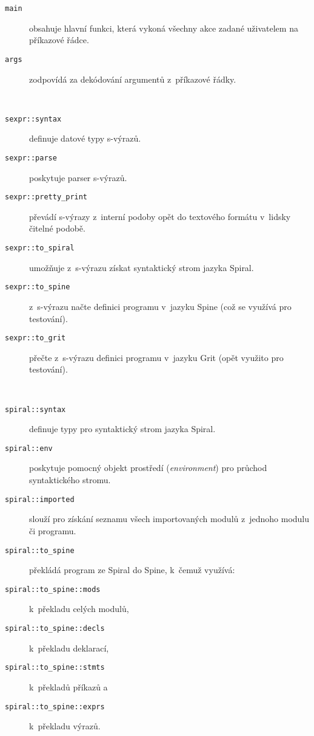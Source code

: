 \begin{description}
  \item[\texttt{main}] obsahuje hlavní funkci, která vykoná všechny akce zadané
    uživatelem na příkazové řádce.
  \item[\texttt{args}] zodpovídá za dekódování argumentů z~příkazové řádky.
\end{description}
~
\begin{description}
  \item[\texttt{sexpr::syntax}] definuje datové typy s-výrazů.
  \item[\texttt{sexpr::parse}] poskytuje parser s-výrazů.
  \item[\texttt{sexpr::pretty_print}] převádí s-výrazy z~interní podoby opět do
    textového formátu v~lidsky čitelné podobě.
  \item[\texttt{sexpr::to_spiral}] umožňuje z~s-výrazu získat syntaktický strom
    jazyka Spiral.
  \item[\texttt{sexpr::to_spine}] z~s-výrazu načte definici programu v~jazyku
    Spine (což se využívá pro testování).
  \item[\texttt{sexpr::to_grit}] přečte z~s-výrazu definici programu v~jazyku
    Grit (opět využito pro testování).
\end{description}
~
\begin{description}
  \item[\texttt{spiral::syntax}] definuje typy pro syntaktický strom jazyka
    Spiral.
  \item[\texttt{spiral::env}] poskytuje pomocný objekt prostředí
    (\emph{environment}) pro průchod syntaktického stromu.
  \item[\texttt{spiral::imported}] slouží pro získání seznamu všech
    importovaných modulů z~jednoho modulu či programu.
  \item[\texttt{spiral::to_spine}] překládá program ze Spiral do Spine, k~čemuž
    využívá:
  \item[\texttt{spiral::to_spine::mods}] k~překladu celých modulů,
  \item[\texttt{spiral::to_spine::decls}] k~překladu deklarací,
  \item[\texttt{spiral::to_spine::stmts}] k~překladů příkazů a
  \item[\texttt{spiral::to_spine::exprs}] k~překladu výrazů.
\end{description}
~
